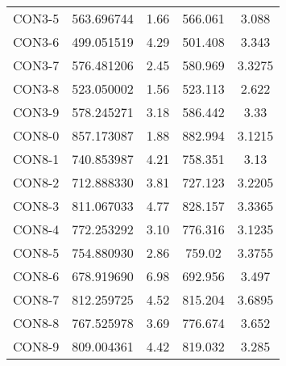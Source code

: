 \begin{table}[ht]
\begin{tabular}{c c c c c}
CON3-5 & 563.696744 & 1.66 & 566.061 & 3.088 \\
CON3-6 & 499.051519 & 4.29 & 501.408 & 3.343 \\
CON3-7 & 576.481206 & 2.45 & 580.969 & 3.3275 \\
CON3-8 & 523.050002 & 1.56 & 523.113 & 2.622 \\
CON3-9 & 578.245271 & 3.18 & 586.442 & 3.33 \\
CON8-0 & 857.173087 & 1.88 & 882.994 & 3.1215 \\
CON8-1 & 740.853987 & 4.21 & 758.351 & 3.13 \\
CON8-2 & 712.888330 & 3.81 & 727.123 & 3.2205 \\
CON8-3 & 811.067033 & 4.77 & 828.157 & 3.3365 \\
CON8-4 & 772.253292 & 3.10 & 776.316 & 3.1235 \\
CON8-5 & 754.880930 & 2.86 & 759.02 & 3.3755 \\
CON8-6 & 678.919690 & 6.98 & 692.956 & 3.497 \\
CON8-7 & 812.259725 & 4.52 & 815.204 & 3.6895 \\
CON8-8 & 767.525978 & 3.69 & 776.674 & 3.652 \\
CON8-9 & 809.004361 & 4.42 & 819.032 & 3.285 \\
[1ex]\hline
\end{tabular}
\label{table:nonlin}
\end{table} \clearpage
